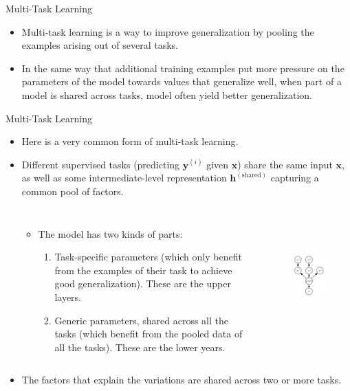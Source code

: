 \documentclass[10pt]{beamer}
\begin{document}
	\begin{frame}{Multi-Task Learning}
		\begin{itemize}
			\pause
			\item Multi-task learning is a way to improve generalization by pooling the examples arising out of several tasks.
			\pause
			\item In the same way that additional training examples put more pressure on the parameters of the model towards values that generalize well, when part of a model is shared across tasks, model often yield better generalization.
		\end{itemize}
	\end{frame}
	
	\begin{frame}{Multi-Task Learning}
		\begin{itemize}
			\item Here is a very common form of multi-task learning.
			\item Different supervised tasks (predicting $\bm{y}^{(i)}$ given $\bm{x}$) share the same input $\bm{x}$, as well as some intermediate-level representation $\bm{h}^{(\text{shared})}$ capturing a common pool of factors.
			
			\begin{columns}[T,onlytextwidth]
				\begin{itemize}
					\item The model has two kinds of parts:
					\begin{enumerate}
						\item Task-specific parameters (which only benefit from the examples of their task to achieve good generalization). These are the upper layers.
						\item Generic parameters, shared across all the tasks (which benefit from the pooled data of all the tasks). These are the lower years.
					\end{enumerate}
				\end{itemize}
				\begin{figure}
					\includegraphics[height=12em]{figures/multi-task-learning.png}
				\end{figure}
			\end{columns}
			\item The factors that explain the variations are shared across two or more tasks.
		\end{itemize}
	\end{frame}
\end{document}
